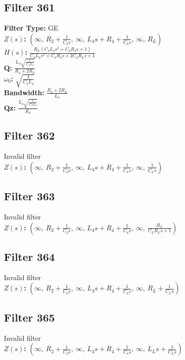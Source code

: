 \documentclass{article}
\begin{document}
\subsection*{Filter 361}
\textbf{Filter Type:} GE \\ 
\textbf{$Z(s)$:} $\left( \infty, \  R_{2} + \frac{1}{C_{2} s}, \  \infty, \  L_{4} s + R_{4} + \frac{1}{C_{4} s}, \  \infty, \  R_{L}\right)$ \\ 
\textbf{$H(s)$:} $\frac{R_{L} \left(C_{4} L_{4} s^{2} + C_{4} R_{4} s + 1\right)}{C_{4} L_{4} s^{2} + C_{4} R_{4} s + 2 C_{4} R_{L} s + 1}$ \\ 
\textbf{Q:} $\frac{L_{4} \sqrt{\frac{1}{C_{4} L_{4}}}}{R_{4} + 2 R_{L}}$ \\ 
\textbf{$\omega_0$:} $\sqrt{\frac{1}{C_{4} L_{4}}}$ \\ 
\textbf{Bandwidth:} $\frac{R_{4} + 2 R_{L}}{L_{4}}$ \\ 
\textbf{Qz:} $\frac{L_{4} \sqrt{\frac{1}{C_{4} L_{4}}}}{R_{4}}$ \\ 
\subsection*{Filter 362}
Invalid filter \\ 
\textbf{$Z(s)$:} $\left( \infty, \  R_{2} + \frac{1}{C_{2} s}, \  \infty, \  L_{4} s + R_{4} + \frac{1}{C_{4} s}, \  \infty, \  \frac{1}{C_{L} s}\right)$ \\ 
\subsection*{Filter 363}
Invalid filter \\ 
\textbf{$Z(s)$:} $\left( \infty, \  R_{2} + \frac{1}{C_{2} s}, \  \infty, \  L_{4} s + R_{4} + \frac{1}{C_{4} s}, \  \infty, \  \frac{R_{L}}{C_{L} R_{L} s + 1}\right)$ \\ 
\subsection*{Filter 364}
Invalid filter \\ 
\textbf{$Z(s)$:} $\left( \infty, \  R_{2} + \frac{1}{C_{2} s}, \  \infty, \  L_{4} s + R_{4} + \frac{1}{C_{4} s}, \  \infty, \  R_{L} + \frac{1}{C_{L} s}\right)$ \\ 
\subsection*{Filter 365}
Invalid filter \\ 
\textbf{$Z(s)$:} $\left( \infty, \  R_{2} + \frac{1}{C_{2} s}, \  \infty, \  L_{4} s + R_{4} + \frac{1}{C_{4} s}, \  \infty, \  L_{L} s + \frac{1}{C_{L} s}\right)$ \\ 
\end{document}

